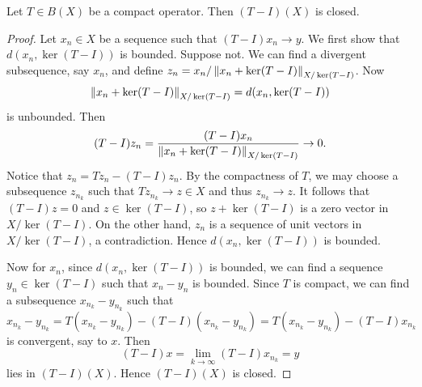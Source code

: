 \begin{proposition}\label{prop:compact_image_closed}
    Let $T\in B(X)$ be a compact operator. Then $(T-I)(X)$ is closed. 
\end{proposition}
\begin{proof}
    Let $x_n\in X$ be a sequence such that $(T-I)x_n\to y$. We first 
    show that $d(x_n, \ker(T-I))$ is bounded. Suppose not. We can 
    find a divergent subsequence, say $x_n$, and define 
    $z_n = x_n/\left\lVert {x_n + \ker(T-I)} \right\rVert_{X/\ker(T-I)}$. Now 
    \begin{equation*}
        \left\lVert {x_n + \ker(T-I)} \right\rVert_{X/\ker(T-I)} = d(x_n, \ker(T-I))
    \end{equation*}
    is unbounded. Then 
    \begin{equation*}
        (T-I)z_n = \frac{(T-I)x_n}{\left\lVert {x_n + \ker(T-I)} \right\rVert_{X/\ker(T-I)}} 
        \to 0.
    \end{equation*}
    Notice that $z_n = Tz_n - (T-I)z_n$. By the compactness of $T$,
    we may choose a subsequence $z_{n_k}$ such that $Tz_{n_k}\to z\in X$ 
    and thus $z_{n_k}\to z$. It follows that $(T-I)z = 0$ and 
    $z\in\ker(T-I)$, so $z+\ker(T-I)$ is a zero vector in 
    $X/\ker(T-I)$. On the other hand, $z_n$ is a sequence of unit vectors 
    in $X/\ker(T-I)$, a contradiction. Hence $d(x_n, \ker(T-I))$ is bounded. 

    Now for $x_n$, since $d(x_n, \ker(T-I))$ is bounded, we can 
    find a sequence $y_n\in\ker(T-I)$ such that $x_n-y_n$ is bounded. 
    Since $T$ is compact, we can find a subsequence $x_{n_k} - y_{n_k}$ such that 
    \begin{equation*}
        x_{n_k} - y_{n_k} = T(x_{n_k} - y_{n_k}) - (T-I)(x_{n_k} - y_{n_k}) 
        = T(x_{n_k} - y_{n_k}) - (T-I)x_{n_k}
    \end{equation*}
    is convergent, say to $x$. Then
    \begin{equation*}
        (T-I)x = \lim_{k\to\infty} (T-I)x_{n_k} = y
    \end{equation*}
    lies in $(T-I)(X)$. Hence $(T-I)(X)$ is closed.
\end{proof}

